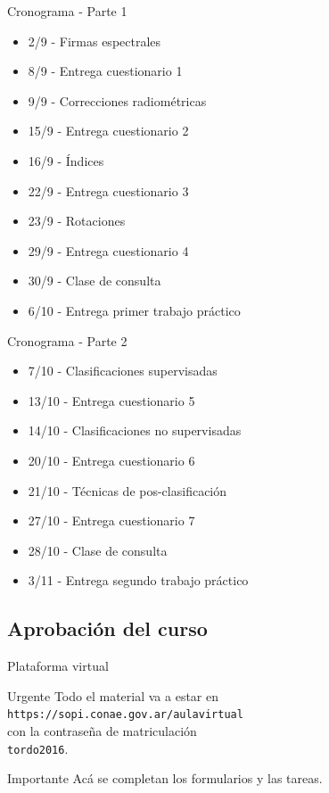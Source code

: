 \documentclass[handout]{beamer}
\begin{document}
\begin{frame}{Cronograma - Parte 1}
  \begin{itemize}
    \item 2/9 - Firmas espectrales
    \item 8/9 - Entrega cuestionario 1
    \item 9/9 - Correcciones radiométricas
    \item 15/9 - Entrega cuestionario 2
    \item 16/9 - Índices
    \item 22/9 - Entrega cuestionario 3
    \item 23/9 - Rotaciones
    \item 29/9 - Entrega cuestionario 4
    \item 30/9 - Clase de consulta
    \item 6/10 - Entrega primer trabajo práctico
  \end{itemize}
\end{frame}
\begin{frame}{Cronograma - Parte 2}
  \begin{itemize}
    \item 7/10 - Clasificaciones supervisadas
    \item 13/10 - Entrega cuestionario 5
    \item 14/10 - Clasificaciones no supervisadas
    \item 20/10 - Entrega cuestionario 6
    \item 21/10 - Técnicas de pos-clasificación
    \item 27/10 - Entrega cuestionario 7
    \item 28/10 - Clase de consulta
    \item 3/11 - Entrega segundo trabajo práctico
  \end{itemize}
\end{frame}

\subsection{Aprobación del curso}
\begin{frame}{Plataforma virtual}
  \begin{block}{Urgente}
    Todo el material va a estar en
    \texttt{https://sopi.conae.gov.ar/aulavirtual}\pause\\
    con la contraseña de matriculación\\
    \texttt{tordo2016}.
  \end{block}\pause
  \begin{alertblock}{Importante}
    Acá se completan los formularios y las tareas.
  \end{alertblock}
\end{frame}
\end{document}
